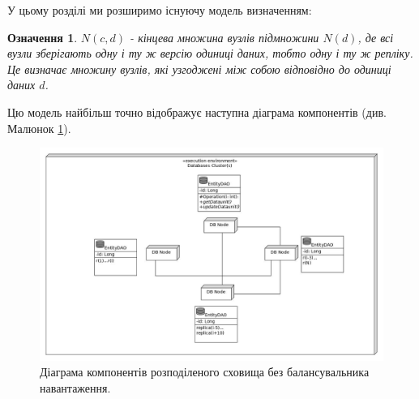 \documentclass[14pt]{vakthesis}
\newtheorem{definition}{Означення}[chapter]
\begin{document}
У цьому розділі ми розширимо існуючу модель визначенням:

\begin{definition}
$N(c, d)$ - кінцева множина вузлів підмножини $N(d)$, де всі вузли зберігають одну і ту ж версію одиниці даних, тобто одну і ту ж репліку. Це визначає множину вузлів, які узгоджені між собою відповідно до одиниці даних $d$.


\end{definition}

Цю модель найбільш точно відображує наступна діаграма компонентів (див. Малюнок \ref{fig:d_components_without_lb}).


\begin{figure}
\centering

\includegraphics[width=\linewidth]{images/d_component_without_lb.jpg}
     \caption{Діаграма компонентів розподіленого сховища без балансувальника навантаження.}
     \label{fig:d_components_without_lb}
\end{figure}
\end{document}
